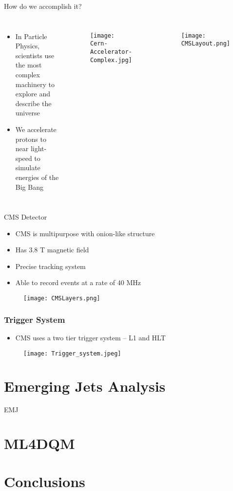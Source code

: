 \documentclass[9pt,aspectratio=169]{beamer}
\begin{document}
\begin{frame}{How do we accomplish it?}
	\begin{columns}
		\begin{itemize}
			\item In Particle Physics, scientists use the most complex machinery to explore and describe the universe
			\item We accelerate protons to near light-speed to simulate energies of the Big Bang
		\end{itemize}
		\begin{figure}
			\centering
			\texttt{[image: Cern-Accelerator-Complex.jpg]}
		\end{figure}
		\begin{figure}
			\centering
			\texttt{[image: CMSLayout.png]}
		\end{figure}
	\end{columns}
\end{frame}

\begin{frame}{CMS Detector}
	\begin{itemize}
		\item CMS is multipurpose with onion-like structure
		\item Has 3.8 T magnetic field
		\item Precise tracking system
		\item Able to record events at a rate of 40 MHz
	\end{itemize}
	\begin{figure}
		\centering
		\texttt{[image: CMSLayers.png]}
	\end{figure}
\end{frame}

\begin{frame}
	\frametitle{Trigger System}
	\begin{itemize}
		\item CMS uses a two tier trigger system -- L1 and HLT
	\end{itemize}
	\vfill
	\begin{figure}
		\texttt{[image: Trigger\_system.jpeg]}
	\end{figure}

\end{frame}



\section{Emerging Jets Analysis}

\begin{frame}{EMJ}

\end{frame}

\section{ML4DQM}


\section{Conclusions}
\end{document}
